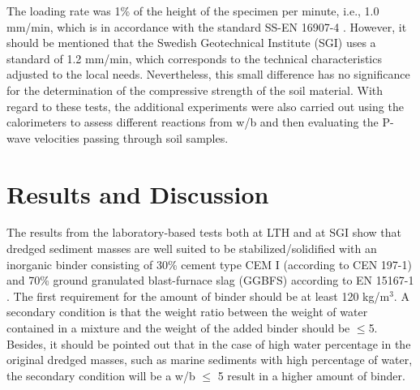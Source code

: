 \documentclass[sustainability,article,accept,pdftex,moreauthors]{Definitions/mdpi}
\begin{document}
{{The loading rate was 1\% of the height of the specimen per minute, i.e., 1.0 mm/min, which is in accordance with the standard SS-EN 16907-4 \cite{SIS2018}. However, it should be mentioned that the Swedish Geotechnical Institute (SGI) uses {a standard of }1.2 mm/min, {which corresponds to the technical characteristics} adjusted to the local needs. {Nevertheless}, this small difference has no significance for the determination of the {compressive }strength of the soil material. With regard to these tests, {the }additional experiments were also carried out using {the} calorimeters to assess different reactions from w/b and then evaluating the P-wave velocities {passing through} soil samples.

\section{Results {and Discussion}}

The results from the laboratory-based tests both at LTH and at SGI show that dredged sediment masses are well suited to be stabilized/solidified with an inorganic binder consisting of 30\% cement type CEM I (according to CEN 197-1) and 70\% ground granulated blast-furnace slag (GGBFS) according to EN 15167-1 \cite{SIS2006}. The first requirement for the amount of binder should be at least 120 kg/m$^3$. A secondary condition is that the weight ratio between the weight of water contained in a mixture and the weight of the added binder should be $\leq$5. Besides, it should be pointed out that in the case of high water{ percentage }in the original dredged masses, such as marine sediments with high percentage of water, the secondary condition will be a w/b $\leq$ 5 result in a higher amount of binder.

}}
\end{document}
